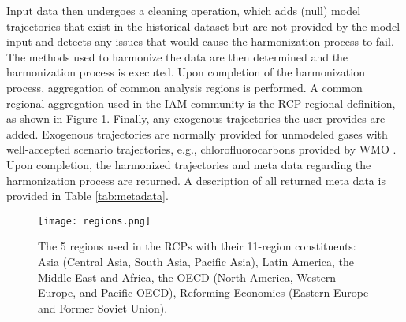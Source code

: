 Input data then undergoes a cleaning operation, which adds (null) model
trajectories that exist in the historical dataset but are not provided by the
model input and detects any issues that would cause the harmonization process to
fail. The methods used to harmonize the data are then determined and the
harmonization process is executed. Upon completion of the harmonization process,
aggregation of common analysis regions is performed. A common regional
aggregation used in the IAM community is the RCP regional definition, as shown
in Figure \ref{fig:regions}. Finally, any exogenous trajectories the user provides
are added. Exogenous trajectories are normally provided for unmodeled gases with
well-accepted scenario trajectories, e.g., chlorofluorocarbons provided by WMO
\cite{wmo2014}. Upon completion, the harmonized trajectories and meta data
regarding the harmonization process are returned. A description of all returned
meta data is provided in Table \ref{tab:metadata}.


\begin{figure}
  \begin{center}
    \texttt{[image: regions.png]}
    \caption[]{
      \label{fig:regions}
      The 5 regions used in the RCPs with their 11-region constituents: Asia
      (Central Asia, South Asia, Pacific Asia), Latin America, the Middle East
      and Africa, the OECD (North America, Western Europe, and Pacific OECD),
      Reforming Economies (Eastern Europe and Former Soviet Union).
    }
  \end{center}
\end{figure}


